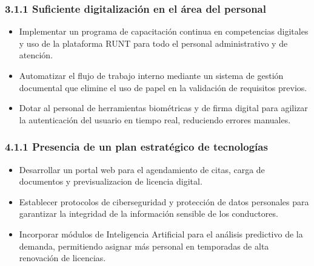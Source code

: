 \subsubsection*{3.1.1 Suficiente digitalización en el área del personal}
\begin{itemize}
\item Implementar un programa de capacitación continua en competencias digitales y uso de la plataforma RUNT para todo el personal administrativo y de atención.
\item Automatizar el flujo de trabajo interno mediante un sistema de gestión documental que elimine el uso de papel en la validación de requisitos previos.
\item Dotar al personal de herramientas biométricas y de firma digital para agilizar la autenticación del usuario en tiempo real, reduciendo errores manuales.
\end{itemize}

\subsubsection*{4.1.1 Presencia de un plan estratégico de tecnologías}
\begin{itemize}
\item Desarrollar un portal web para el agendamiento de citas, carga de documentos y previsualizacion de licencia digital.
\item Establecer protocolos de ciberseguridad y protección de datos personales para garantizar la integridad de la información sensible de los conductores.
\item Incorporar módulos de Inteligencia Artificial para el análisis predictivo de la demanda, permitiendo asignar más personal en temporadas de alta renovación de licencias.
\end{itemize}